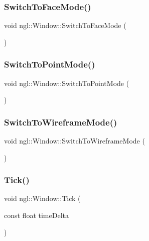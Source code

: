 \subsubsection{\texorpdfstring{Switch\+To\+Face\+Mode()}{SwitchToFaceMode()}}
{\footnotesize\ttfamily void ngl\+::\+Window\+::\+Switch\+To\+Face\+Mode (\begin{DoxyParamCaption}{ }\end{DoxyParamCaption})}

\mbox{\label{classngl_1_1_window_a6f4f1dfd618b0c9f3f2b548b5533d44e}} 
\subsubsection{\texorpdfstring{Switch\+To\+Point\+Mode()}{SwitchToPointMode()}}
{\footnotesize\ttfamily void ngl\+::\+Window\+::\+Switch\+To\+Point\+Mode (\begin{DoxyParamCaption}{ }\end{DoxyParamCaption})}

\mbox{\label{classngl_1_1_window_a21347e984afe3a5fe028725c4e93b3e8}} 
\subsubsection{\texorpdfstring{Switch\+To\+Wireframe\+Mode()}{SwitchToWireframeMode()}}
{\footnotesize\ttfamily void ngl\+::\+Window\+::\+Switch\+To\+Wireframe\+Mode (\begin{DoxyParamCaption}{ }\end{DoxyParamCaption})}

\mbox{\label{classngl_1_1_window_aa75f0944d26e5161a05bacb67bf55dd5}} 
\subsubsection{\texorpdfstring{Tick()}{Tick()}}
{\footnotesize\ttfamily void ngl\+::\+Window\+::\+Tick (\begin{DoxyParamCaption}\item[{const float}]{time\+Delta }\end{DoxyParamCaption})\hspace{0.3cm}{\ttfamily [virtual]}}



